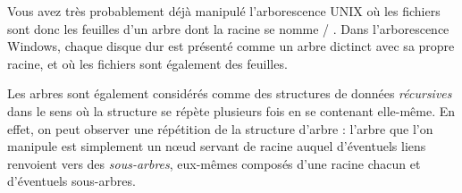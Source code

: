 \documentclass[11pt,a4paper]{article}
\begin{document}
\begin{center}


\end{center}

\bigskip

Vous avez très probablement déjà manipulé l'arborescence UNIX où les fichiers sont donc les feuilles d'un arbre dont la racine se nomme \og / \fg{} .
Dans l'arborescence Windows, chaque disque dur est présenté comme un arbre dictinct avec sa propre racine, et où les fichiers sont également des feuilles.

\bigskip

Les arbres sont également considérés comme des structures de données \textit{récursives} dans le sens où la structure se répète plusieurs fois en se contenant elle-même.
En effet, on peut observer une répétition de la structure d'arbre : l'arbre que l'on manipule est simplement un nœud servant de racine auquel d'éventuels liens renvoient vers des \textit{sous-arbres}, eux-mêmes composés d'une racine chacun et d'éventuels sous-arbres.

\end{document}
